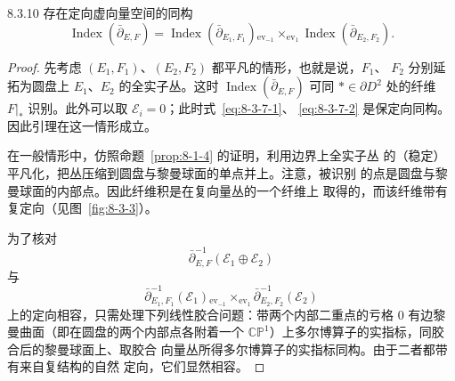 \begin{lemma}{8.3.10}\label{lem:8-3-10}
存在定向虚向量空间的同构
\[
 \operatorname{Index}(\bar\partial_{E,F})
 =\operatorname{Index}(\bar\partial_{E_1,F_1})
 {}_{\operatorname{ev}_{-1}}\!\times_{\operatorname{ev}_1}
 \operatorname{Index}(\bar\partial_{E_2,F_2}).
\]
\end{lemma}

\begin{proof}
先考虑 $(E_1,F_1)$、$(E_2,F_2)$ 都平凡的情形，也就是说，$F_1$、
$F_2$ 分别延拓为圆盘上 $E_1$、$E_2$ 的全实子丛。这时
$\operatorname{Index}(\bar\partial_{E,F})$ 可同
$*\in\partial D^2$ 处的纤维 $F|_*$ 识别。此外可以取
$\mathcal E_i=0$；此时式~\eqref{eq:8-3-7-1}、
\eqref{eq:8-3-7-2} 是保定向同构。因此引理在这一情形成立。

在一般情形中，仿照命题~\ref{prop:8-1-4} 的证明，利用边界上全实子丛
的（稳定）平凡化，把丛压缩到圆盘与黎曼球面的单点并上。注意，被识别
的点是圆盘与黎曼球面的内部点。因此纤维积是在复向量丛的一个纤维上
取得的，而该纤维带有复定向（见图~\ref{fig:8-3-3}）。



为了核对
\[
 \bar\partial_{E,F}^{-1}(\mathcal E_1\oplus\mathcal E_2)
\]
与
\[
 \bar\partial_{E_1,F_1}^{-1}(\mathcal E_1)
 {}_{\operatorname{ev}_{-1}}\!\times_{\operatorname{ev}_1}
 \bar\partial_{E_2,F_2}^{-1}(\mathcal E_2)
\]
上的定向相容，只需处理下列线性胶合问题：带两个内部二重点的亏格
$0$ 有边黎曼曲面（即在圆盘的两个内部点各附着一个
$\mathbb{CP}^1$）上多尔博算子的实指标，同胶合后的黎曼球面上、取胶合
向量丛所得多尔博算子的实指标同构。由于二者都带有来自复结构的自然
定向，它们显然相容。
\end{proof}
